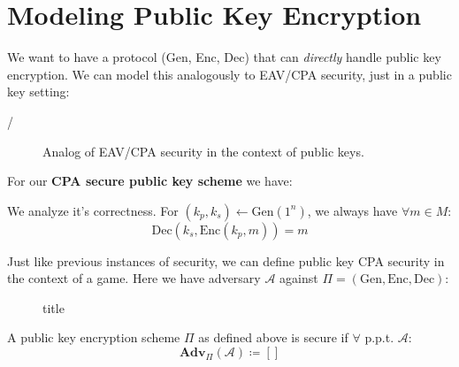 \section{Modeling Public Key Encryption}
We want to have a protocol (Gen, Enc, Dec) that can \emph{directly} handle public key encryption. We can model this analogously to EAV/CPA security, just in a public key setting:

/\begin{figure}[H]
	\centering
	\caption{Analog of EAV/CPA security in the context of public keys.}
	\label{fig:pubeavcpa}
\end{figure}

\begin{definition}
	For our \textbf{CPA secure public key scheme} we have:
	We analyze it's correctness. For \((k_p, k_s) \gets \mathrm{Gen}(1^n)\), we always have \(\forall m \in M\):
	\[
		\mathrm{Dec}(k_s, \mathrm{Enc}(k_p, m)) = m
	\] 
\end{definition}

Just like previous instances of security, we can define public key CPA security in the context of a game. Here we have adversary \(\mathcal{A} \) against \(\Pi = (\mathrm{Gen, Enc, Dec})\):

\begin{figure}[H]
	\centering
	\caption{title}
	\label{fig:pubcpasec}
\end{figure}

\begin{definition}
	A public key encryption scheme \(\Pi\) as defined above is secure if \(\forall\) p.p.t. \(\mathcal{A} \):
	\[
		\mathbf{Adv}_\Pi (\mathcal{A}) \coloneqq \left[ 
		 \right] 
	\]
\end{definition}